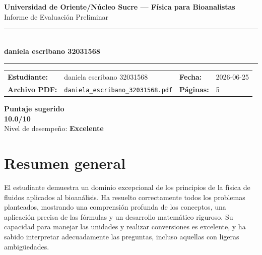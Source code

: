 \documentclass[11pt,a4paper]{article}
\begin{document}
\begin{center}
  {\Large\bfseries\color{azulTitulo} Universidad de Oriente/Núcleo Sucre --- Física para Bioanalistas}\\[4pt]
  {\large Informe de Evaluación Preliminar}\\[12pt]
  \rule{\linewidth}{1.2pt}\\[6pt]
  {\LARGE\bfseries daniela escribano 32031568}\\[4pt]
  \rule{\linewidth}{0.6pt}
\end{center}

\vspace{4pt}
\begin{tcolorbox}[cajaTitulo, title=Datos del informe]
\begin{tabular}{@{}llll@{}}
  \textbf{Estudiante:}  & daniela escribano 32031568  &
  \textbf{Fecha:}       & 2026-06-25 \\[4pt]
  \textbf{Archivo PDF:} & \texttt{daniela\_escribano\_32031568.pdf}  &
  \textbf{Páginas:}     & 5 \\
\end{tabular}
\end{tcolorbox}

\vspace{6pt}
\begin{center}
  \begin{tcolorbox}[
    enhanced,
    colback=white, colframe=desempeno_excelente,
    width=0.62\linewidth,
    boxrule=2pt,
    halign=center, valign=center,
    top=8pt, bottom=8pt,
  ]
    \centering
    {\large\bfseries Puntaje sugerido}\\[6pt]
    {\Huge\bfseries\color{desempeno_excelente} 10.0/10}\\[6pt]
    {\large Nivel de desempeño: \textbf{\color{desempeno_excelente} Excelente}}
  \end{tcolorbox}
\end{center}

\section*{Resumen general}
El estudiante demuestra un dominio excepcional de los principios de la física de fluidos aplicados al bioanálisis. Ha resuelto correctamente todos los problemas planteados, mostrando una comprensión profunda de los conceptos, una aplicación precisa de las fórmulas y un desarrollo matemático riguroso. Su capacidad para manejar las unidades y realizar conversiones es excelente, y ha sabido interpretar adecuadamente las preguntas, incluso aquellas con ligeras ambigüedades.
\end{document}
